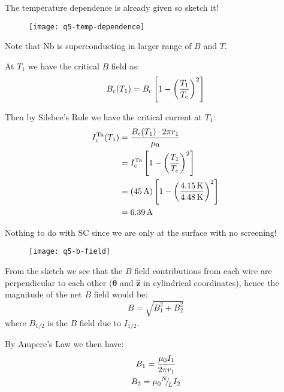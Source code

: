 \begin{parts}
\begin{subparts}
		\subpart The temperature dependence is already given so sketch it!
		
		\begin{figure}[H]
			\centering
			\texttt{[image: q5-temp-dependence]}
		\end{figure}
		
		Note that Nb is superconducting in larger range of $B$ and $T$.
		
		\subpart At $T_1$ we have the critical $B$ field as:
		\begin{equation}
			B_\textnormal{c}(T_1) = B_\textnormal{c}\left[1 - \left(\frac{T_1}{T_\textnormal{c}}\right)^2\right]
		\end{equation}
		
		Then by Silsbee's Rule we have the critical current at $T_1$:
		\begin{align*}
			I_\textnormal{c}^\textnormal{Ta}(T_1) &= \frac{B_\textnormal{c}(T_1) \cdot 2\pi r_1}{\mu_0} \\
			&= I_\textnormal{c}^\textnormal{Ta} \left[1-\left(\frac{T_1}{T_\textnormal{c}}\right)^2\right] \\
			&= \left(\SI{45}{\ampere}\right) \left[1-\left(\frac{\SI{4.15}{\kelvin}}{\SI{4.48}{\kelvin}}\right)^2\right] \\
			&= \SI{6.39}{\ampere}
		\end{align*}
		
		\subpart Nothing to do with SC since we are only at the surface with no screening!
		
		\begin{figure}[H]
			\centering
			\texttt{[image: q5-b-field]}
		\end{figure}
		
		From the sketch we see that the $B$ field contributions from each wire are perpendicular to each other ($\hat{\bm{\theta}}$ and $\hat{\mathbf{z}}$ in cylindrical coordinates), hence the magnitude of the net $B$ field would be:
		\begin{equation}
			B = \sqrt{B_1^2 + B_2^2}
			\label{eqn:q5-net-b-field}
		\end{equation}
		where $B_{1/2}$ is the $B$ field due to $I_{1/2}$.
		
		By Ampere's Law we then have:
		\begin{gather}
			B_1 = \frac{\mu_0 I_1}{2\pi r_1}
			\label{eqn:q5-b1} \\
			B_2 = \mu_0 {{}^{N}{\mskip -5mu/\mskip -3mu}_{L}} I_2
			\label{eqn:q5-b2}
		\end{gather}
		

\end{subparts}
\end{parts}
